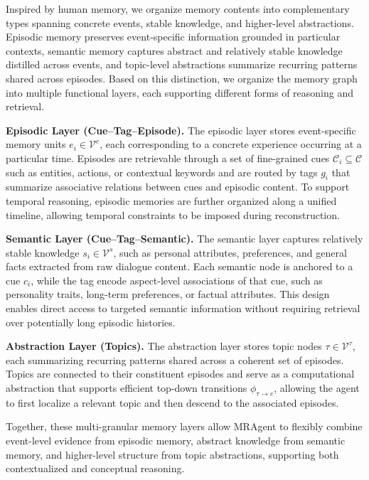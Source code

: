 \documentclass{llmxive}
\begin{document}
Inspired by human memory, we organize memory contents into complementary types spanning concrete events, stable knowledge, and higher-level abstractions. Episodic memory preserves event-specific information grounded in particular contexts, semantic memory captures abstract and relatively stable knowledge distilled across events, and topic-level abstractions summarize recurring patterns shared across episodes. Based on this distinction, we organize the memory graph into multiple functional layers, each supporting different forms of reasoning and retrieval.

\textbf{Episodic Layer (Cue--Tag--Episode).}
The episodic layer stores event-specific memory units $e_i \in \mathcal{V}^e$, each corresponding to a concrete experience occurring at a particular time. Episodes are retrievable through a set of fine-grained cues $\mathcal{C}_i \subseteq \mathcal{C}$
such as entities, actions, or contextual keywords and are routed by tags $g_i$ that summarize associative relations between cues and episodic content.
To support temporal reasoning, episodic memories are further organized along a unified timeline,
allowing temporal constraints to be imposed during reconstruction.

\textbf{Semantic Layer (Cue--Tag--Semantic).}
The semantic layer captures relatively stable knowledge $s_i \in \mathcal{V}^s$, such as personal attributes, preferences, and general facts extracted from raw dialogue content.
Each semantic node is anchored to a cue $c_i$, while the tag encode aspect-level associations of that cue, such as personality traits, long-term preferences, or factual attributes. This design enables direct access to targeted semantic information without requiring retrieval over potentially long episodic histories.

\textbf{Abstraction Layer (Topics).}
The abstraction layer stores topic nodes $\tau \in \mathcal{V}^\tau$, each
summarizing recurring patterns shared across a coherent set of episodes. Topics
are connected to their constituent episodes and serve as a computational
abstraction that supports efficient top-down transitions $\phi_{\tau \to e}$,
allowing the agent to first localize a relevant topic and then descend to the
associated episodes.

Together, these multi-granular memory layers allow MRAgent to flexibly combine
event-level evidence from episodic memory, abstract knowledge from semantic
memory, and higher-level structure from topic abstractions, supporting both
contextualized and conceptual reasoning.
\end{document}
